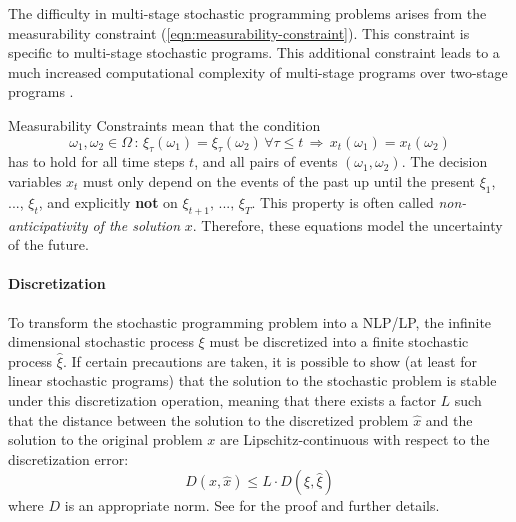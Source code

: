 \documentclass[a4paper, 12pt] {article}
\begin{document}
The difficulty in multi-stage stochastic programming problems arises from the measurability constraint (\ref{eqn:measurability-constraint}). This constraint is specific to multi-stage stochastic programs.
This additional constraint leads to a much increased computational complexity of multi-stage programs over two-stage programs \cite{Shapiro2005,Shapiro2008}.
%
\par{Measurability Constraints} 
mean that the condition
\begin{equation}
  \label{eq:mathematical-NAC}
  \omega_1,\omega_2\in \Omega \, : \, \xi_\tau(\omega_1) = \xi_\tau(\omega_2)\,\forall \tau\leq t\,\Rightarrow \, x_t(\omega_1) = x_t(\omega_2) 
\end{equation}
has to hold for all time steps $t$, and all pairs of events $(\omega_1,\omega_2)$. 
The decision variables $x_t$ must only depend on the events of the past up until the present $\xi_1$, ..., $\xi_t$, and explicitly \textbf{not} on $\xi_{t+1},\, ...,\,\xi_T$. 
This property is often called \textit{non-anticipativity of the solution} $x$. 
Therefore, these equations model the uncertainty of the future.
%
\paragraph{Discretization}
%
To transform the stochastic programming problem into a NLP/LP, the infinite dimensional stochastic process $\xi$ must be discretized into a finite stochastic process $\hat{\xi}$. If certain precautions are taken, it is possible to show (at least for linear stochastic programs) that the solution to the stochastic problem is stable under this discretization operation, meaning that there exists a factor $L$ such that the distance between the solution to the discretized problem $\hat{x}$ and the solution to the original problem $x$ are Lipschitz-continuous with respect to the discretization error:
\begin{equation}
  D(x , \hat{x}) \leq L\cdot D(\xi,\hat{\xi})
\end{equation}
where $D$ is an appropriate norm. See \cite{Heitsch2009} for the proof and further details.
\end{document}
